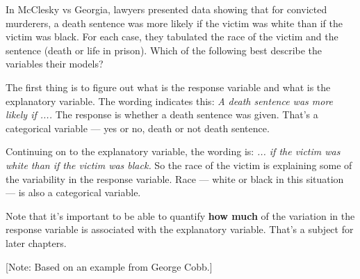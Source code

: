
In McClesky vs Georgia, lawyers presented data showing that for
convicted murderers, a death sentence was more likely if the victim
was white than if the victim was black.  For each case, they tabulated
the race of the victim and the sentence (death or life in prison).
Which of the following best describe the variables their models?
\begin{MultipleChoice}
\end{MultipleChoice}

\begin{AnswerText}
The first thing is to figure out what is the response variable and
what is the explanatory variable.  The wording indicates this: {\em A
death sentence was more likely if ....}   The response is whether a
death sentence was given.  That's a categorical variable --- yes or
no, death or not death sentence.  

Continuing on to the explanatory variable, the wording is: {\em ... if the victim
was white than if the victim was black.}  So the race of the victim is
explaining some of the variability in the response variable.  Race ---
white or black in this situation --- is also a categorical variable.

Note that it's important to be able to quantify {\bf how much} of the
variation in the response variable is associated with the explanatory
variable.  That's a subject for later chapters.
\end{AnswerText}

[Note: Based on an example from George Cobb.]